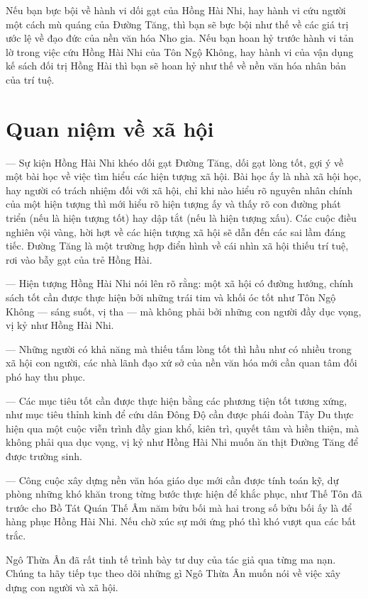 Nếu bạn bực bội về hành vi dối gạt của Hồng Hài Nhi, hay hành vi cứu người một cách mù quáng của Đường Tăng, thì bạn sẽ bực bội như thế về các giá trị ước lệ về đạo đức của nền văn hóa Nho gia. Nếu bạn hoan hỷ trước hành vi tản lờ trong việc cứu Hồng Hài Nhi của Tôn Ngộ Không, hay hành vi của vận dụng kế sách đối trị Hồng Hài thì bạn sẽ hoan hỷ như thế về nền văn hóa nhân bản của trí tuệ.

\section{Quan niệm về xã hội} %
\label{sec:40_41_xa_hoi}

— Sự kiện Hồng Hài Nhi khéo dối gạt Đường Tăng, dối gạt lòng tốt, gợi ý về một bài học về việc tìm hiểu các hiện tượng xã hội. Bài học ấy là nhà xã hội học, hay người có trách nhiệm đối với xã hội, chỉ khi nào hiểu rõ nguyên nhân chính của một hiện tượng thì mới hiểu rõ hiện tượng ấy và thấy rõ con đường phát triển (nếu là hiện tượng tốt) hay dập tắt (nếu là hiện tượng xấu). Các cuộc điều nghiên vội vàng, hời hợt về các hiện tượng xã hội sẽ dẫn đến các sai lầm đáng tiếc. Đường Tăng là một trường hợp điển hình về cái nhìn xã hội thiếu trí tuệ, rơi vào bẫy gạt của trẻ Hồng Hài.

— Hiện tượng Hồng Hài Nhi nói lên rõ rằng: một xã hội có đường hướng, chính sách tốt cần được thực hiện bởi những trái tim và khối óc tốt như Tôn Ngộ Không — sáng suốt, vị tha — mà không phải bởi những con người đầy dục vọng, vị kỷ như Hồng Hài Nhi.

— Những người có khả năng mà thiếu tấm lòng tốt thì hầu như có nhiều trong xã hội con người, các nhà lãnh đạo xứ sở của nền văn hóa mới cần quan tâm đối phó hay thu phục.

— Các mục tiêu tốt cần được thực hiện bằng các phương tiện tốt tương xứng, như mục tiêu thỉnh kinh để cứu dân Đông Độ cần được phái đoàn Tây Du thực hiện qua một cuộc viễn trình đầy gian khổ, kiên trì, quyết tâm và hiền thiện, mà không phải qua dục vọng, vị kỷ như Hồng Hài Nhi muốn ăn thịt Đường Tăng để được trường sinh.

— Công cuộc xây dựng nền văn hóa giáo dục mới cần được tính toán kỹ, dự phòng những khó khăn trong từng bước thực hiện để khắc phục, như Thế Tôn đã trước cho Bồ Tát Quán Thế Âm năm bửu bối mà hai trong số bửu bối ấy là để hàng phục Hồng Hài Nhi. Nếu chờ xúc sự mới ứng phó thì khó vượt qua các bất trắc.

Ngô Thừa Ân đã rất tinh tế trình bày tư duy của tác giả qua từng ma nạn. Chúng ta hãy tiếp tục theo dõi những gì Ngô Thừa Ân muốn nói về việc xây dựng con người và xã hội.

